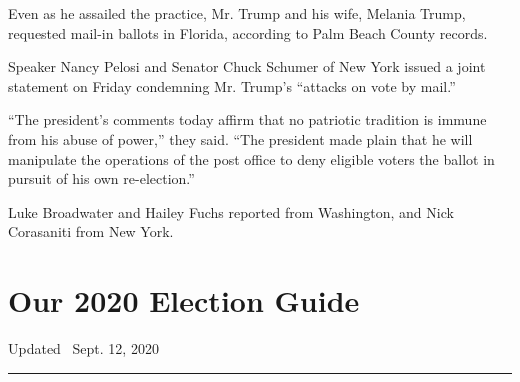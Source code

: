 Even as he assailed the practice, Mr. Trump and his wife, Melania Trump,
requested mail-in ballots in Florida, according to Palm Beach County
records.

Speaker Nancy Pelosi and Senator Chuck Schumer of New York issued a
joint statement on Friday condemning Mr. Trump's ``attacks on vote by
mail.''

``The president's comments today affirm that no patriotic tradition is
immune from his abuse of power,'' they said. ``The president made plain
that he will manipulate the operations of the post office to deny
eligible voters the ballot in pursuit of his own re-election.''

Luke Broadwater and Hailey Fuchs reported from Washington, and Nick
Corasaniti from New York.

\hypertarget{our-2020-election-guide}{%
\section{Our 2020 Election Guide}\label{our-2020-election-guide}}

Updated ~Sept. 12, 2020

\begin{center}\rule{0.5\linewidth}{\linethickness}\end{center}

